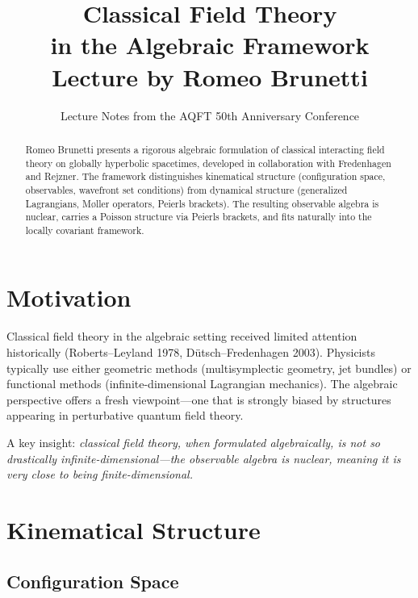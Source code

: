 \documentclass[11pt,a4paper]{article}
\title{\textbf{Classical Field Theory\\in the Algebraic Framework}\\[6pt]
\large Lecture by Romeo Brunetti}
\author{Lecture Notes from the AQFT 50th Anniversary Conference}
\date{}
\begin{document}
\maketitle

\begin{abstract}
Romeo Brunetti presents a rigorous algebraic formulation of classical interacting
field theory on globally hyperbolic spacetimes, developed in collaboration with
Fredenhagen and Rejzner. The framework distinguishes kinematical structure
(configuration space, observables, wavefront set conditions) from dynamical
structure (generalized Lagrangians, M\o ller operators, Peierls brackets).
The resulting observable algebra is nuclear, carries a Poisson structure via
Peierls brackets, and fits naturally into the locally covariant framework.
\end{abstract}

\tableofcontents

\section{Motivation}

Classical field theory in the algebraic setting received limited attention
historically (Roberts--Leyland 1978, D\"utsch--Fredenhagen 2003). Physicists
typically use either geometric methods (multisymplectic geometry, jet bundles)
or functional methods (infinite-dimensional Lagrangian mechanics). The algebraic
perspective offers a fresh viewpoint---one that is strongly biased by structures
appearing in perturbative quantum field theory.

A key insight: \emph{classical field theory, when formulated algebraically,
is not so drastically infinite-dimensional---the observable algebra is nuclear,
meaning it is very close to being finite-dimensional.}

\section{Kinematical Structure}

\subsection{Configuration Space}
\end{document}
